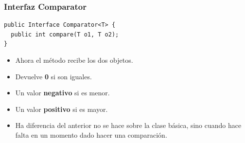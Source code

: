 \documentclass{beamer}
\begin{document}
\begin{frame}[fragile]
\frametitle{Interfaz Comparator}
\begin{verbatim}
public Interface Comparator<T> {
  public int compare(T o1, T o2);
}
\end{verbatim}
\pause
\begin{itemize}[<+->]
\item Ahora el método recibe los dos objetos.
\item Devuelve \textbf{0} si son iguales.
\item Un valor \textbf{negativo} si es menor.
\item Un valor \textbf{positivo} si es mayor.
\item Ha diferencia del anterior no se hace sobre la clase básica, sino cuando hace falta en un momento dado hacer una comparación.
\end{itemize}
\end{frame}
\end{document}
